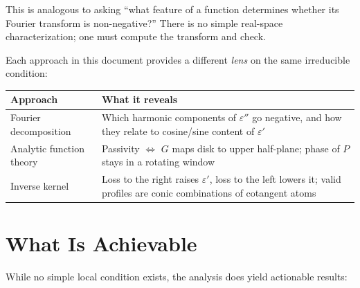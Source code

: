 \documentclass[11pt]{article}
\newcommand{\eps}{\varepsilon}
\begin{document}
This is analogous to asking ``what feature of a function determines whether its Fourier transform is non-negative?''  There is no simple real-space characterization; one must compute the transform and check.

Each approach in this document provides a different \emph{lens} on the same irreducible condition:

\begin{center}
\begin{tabular}{lp{8cm}}
\toprule
\textbf{Approach} & \textbf{What it reveals} \\
\midrule
Fourier decomposition & Which harmonic components of $\eps''$ go negative, and how they relate to cosine/sine content of $\eps'$ \\[4pt]
Analytic function theory & Passivity $\Longleftrightarrow$ $G$ maps disk to upper half-plane; phase of $P$ stays in a rotating window \\[4pt]
Inverse kernel & Loss to the right raises $\eps'$, loss to the left lowers it; valid profiles are conic combinations of cotangent atoms \\
\bottomrule
\end{tabular}
\end{center}

\section{What Is Achievable}\label{sec:achievable}

While no simple local condition exists, the analysis does yield actionable results:
\end{document}
